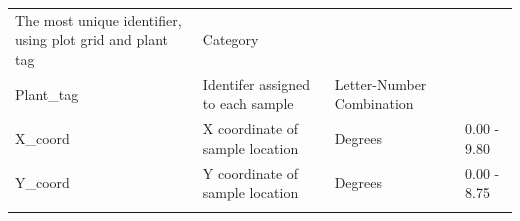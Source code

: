 \documentclass[
  12pt,
]{article}
\begin{document}
\begin{longtable}[]{@{}llll@{}}
\begin{minipage}[t]{0.35\columnwidth}
The most unique identifier, using plot grid and plant tag\strut
\end{minipage} & \begin{minipage}[t]{0.18\columnwidth}\raggedright
Category\strut
\end{minipage} & \begin{minipage}[t]{0.18\columnwidth}\raggedright
\strut
\end{minipage}\tabularnewline
\begin{minipage}[t]{0.18\columnwidth}\raggedright
Plant\_tag\strut
\end{minipage} & \begin{minipage}[t]{0.35\columnwidth}\raggedright
Identifer assigned to each sample\strut
\end{minipage} & \begin{minipage}[t]{0.18\columnwidth}\raggedright
Letter-Number Combination\strut
\end{minipage} & \begin{minipage}[t]{0.18\columnwidth}\raggedright
\strut
\end{minipage}\tabularnewline
\begin{minipage}[t]{0.18\columnwidth}\raggedright
X\_coord\strut
\end{minipage} & \begin{minipage}[t]{0.35\columnwidth}\raggedright
X coordinate of sample location\strut
\end{minipage} & \begin{minipage}[t]{0.18\columnwidth}\raggedright
Degrees\strut
\end{minipage} & \begin{minipage}[t]{0.18\columnwidth}\raggedright
0.00 - 9.80\strut
\end{minipage}\tabularnewline
\begin{minipage}[t]{0.18\columnwidth}\raggedright
Y\_coord\strut
\end{minipage} & \begin{minipage}[t]{0.35\columnwidth}\raggedright
Y coordinate of sample location\strut
\end{minipage} & \begin{minipage}[t]{0.18\columnwidth}\raggedright
Degrees\strut
\end{minipage} & \begin{minipage}[t]{0.18\columnwidth}\raggedright
0.00 - 8.75\strut
\end{minipage}\tabularnewline
\begin{minipage}[t]{0.18\columnwidth}\raggedright

\end{minipage}
\end{longtable}
\end{document}
